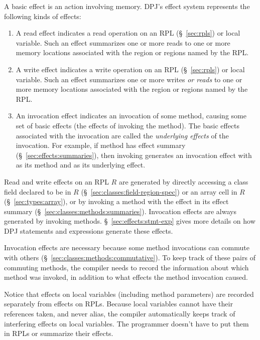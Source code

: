 A basic effect is an action involving memory.  DPJ's effect system
represents the following kinds of effects:
%
\begin{enumerate}
%
\item {} A read effect indicates a read operation
  on an RPL (\S~\ref{sec:rpls}) or local variable.  Such an effect
  summarizes one or more reads to one or more memory locations
  associated with the region or regions named by the RPL.
%
\item {} A write effect indicates a write operation
  on an RPL (\S~\ref{sec:rpls}) or local variable.  Such an effect
  summarizes one or more writes \emph{or reads} to one or more memory
  locations associated with the region or regions named by the RPL.
%
\item {} An invocation effect indicates an
  invocation of some method, causing some set of basic effects (the
  effects of invoking the method).  The basic effects associated with
  the invocation are called the \emph{underlying effects} of the
  invocation.  For example, if method  has effect summary
   (\S~\ref{sec:effects:summaries}), then invoking
   generates an invocation effect with  as its method
  and  as its underlying effect.
%
\end{enumerate}

Read and write effects on an RPL $R$ are generated by directly
accessing a class field declared to be in $R$
(\S~\ref{sec:classes:field-region-spec}) or an array cell in $R$
(\S~\ref{sec:types:array}), or by invoking a method with the effect in
its effect summary (\S~\ref{sec:classes:methods:summaries}).
Invocation effects are always generated by invoking methods.
\S~\ref{sec:effects:stmt-exp} gives more details on how DPJ statements
and expressions generate these effects.

Invocation effects are necessary because some method invocations can
commute with others (\S~\ref{sec:classes:methods:commutative}).  To
keep track of these pairs of commuting methods, the compiler needs to
record the information about which method was invoked, in addition to
what effects the method invocation caused.

Notice that effects on local variables (including method parameters)
are recorded separately from effects on RPLs.  Because local variables
cannot have their references taken, and never alias, the compiler
automatically keeps track of interfering effects on local variables.
The programmer doesn't have to put them in RPLs or summarize their
effects.

